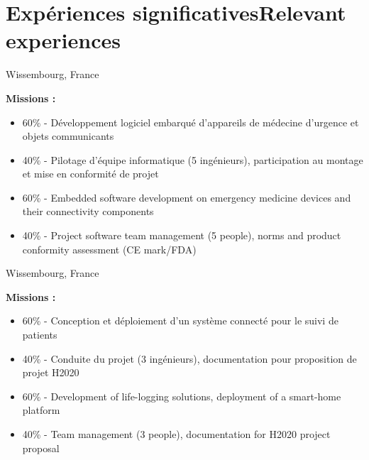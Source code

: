 \section{\ifnativelang Exp\'eriences significatives\else Relevant experiences\fi}

{}{}{Wissembourg, France}{
\textbf{Missions :} 
\begin{itemize}
\ifnativelang
\item 60\% - D\'eveloppement logiciel embarqu\'e d'appareils de médecine d'urgence et objets communicants
\item 40\% - Pilotage d'\'equipe informatique (5 ing\'enieurs), participation au montage et mise en conformit\'e de projet
\else
\item 60\% - Embedded software development on emergency medicine devices and their connectivity components
\item 40\% - Project software team management (5 people),  norms and product conformity assessment (CE mark/FDA)
\fi
\end{itemize}
}

\vspace{\ItemsSpacing}

{}{}{Wissembourg, France}{
\textbf{Missions :} 
\begin{itemize}
\ifnativelang
\item 60\% - Conception et d\'eploiement d'un syst\`eme connect\'e pour le suivi de patients
\item 40\% - Conduite du projet (3 ing\'enieurs), documentation pour proposition de projet H2020
\else
\item 60\% - Development of life-logging solutions, deployment of a smart-home platform
\item 40\% - Team management (3 people), documentation for H2020 project proposal
\fi
\end{itemize}
}


